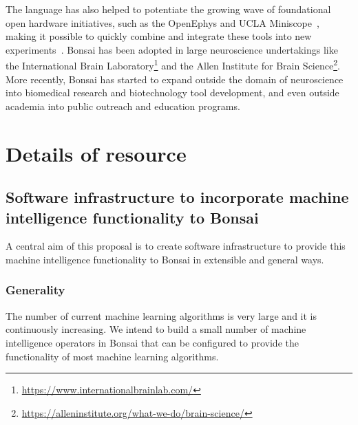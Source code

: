 \documentclass[a4paper,11point]{article}
\begin{document}
The language has also helped to potentiate the growing wave of foundational
open hardware initiatives, such as the OpenEphys \citep{siegleEtAl17} and UCLA
Miniscope~\citep{caiEtAl16}, making it possible to quickly combine and
integrate these tools into new experiments~\citep{buccinoEtAl18}.
%
Bonsai has been adopted in large neuroscience undertakings like the
International Brain
Laboratory\footnote{\href{https://www.internationalbrainlab.com/}{https://www.internationalbrainlab.com/}}
and the Allen Institute for Brain
Science\footnote{\href{https://alleninstitute.org/what-we-do/brain-science/}{https://alleninstitute.org/what-we-do/brain-science/}}.
%
More recently, Bonsai has started to expand outside the domain of neuroscience
into biomedical research and biotechnology tool development, and even outside
academia into public outreach and education programs.

\section{Details of resource}

\subsection{Software infrastructure to incorporate machine intelligence
functionality to Bonsai}
\label{sec:softwareInfrastructure}

A central aim of this proposal is to create software infrastructure to provide
this machine intelligence functionality to Bonsai in extensible and general
ways.

\subsubsection{Generality}

The number of current machine learning algorithms is very large and it is
continuously increasing. We intend to build a small number of machine
intelligence operators in Bonsai that can be configured to provide the
functionality of most machine learning algorithms.
\end{document}
